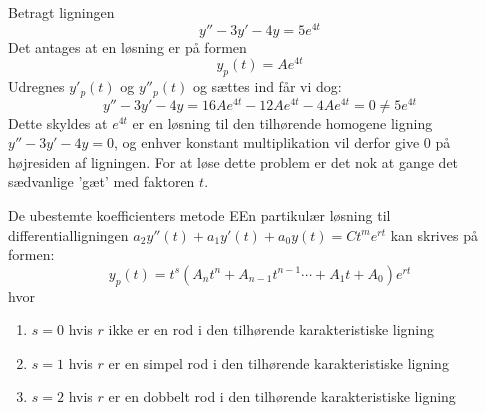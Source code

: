 \begin{Example}\hfill \break
\textnormal{Betragt ligningen} $$y'' -3y'-4y=5e^{4t}$$ \textnormal{Det antages at en løsning er på formen} $$y_p(t)=Ae^{4t}$$ \textnormal{Udregnes $y'_p(t)$ og $y''_p(t)$ og sættes ind får vi dog:}
$$y'' -3y'-4y=16Ae^{4t}-12Ae^{4t}-4Ae^{4t}=0  \neq 5e^{4t}$$
\textnormal{Dette skyldes at $e^{4t}$ er en løsning til den tilhørende homogene ligning $y'' -3y'-4y=0$, og enhver konstant multiplikation vil derfor give 0 på højresiden af ligningen. For at løse dette problem er det nok at gange det sædvanlige 'gæt' med faktoren $t$.}
\end{Example}

\hfill \break
\begin{prop}{De ubestemte koefficienters metode}
EEn partikulær løsning til differentialligningen $a_2y''(t)+a_1y'(t)+a_0y(t)=Ct^me^{rt}$ kan skrives på formen: 
$$y_p(t)= t^s(A_nt^n+A_{n-1}t^{n-1}  \cdots +A_1t+A_0)e^{rt}$$ 
hvor 
\begin{enumerate}
    \item $s=0$ hvis $r$ ikke er en rod i den tilhørende karakteristiske ligning
    \item $s=1$ hvis $r$ er en simpel rod i den tilhørende karakteristiske ligning
    \item $s=2$ hvis $r$ er en dobbelt rod i den tilhørende karakteristiske ligning
\end{enumerate}
\end{prop}
\hfill \break

